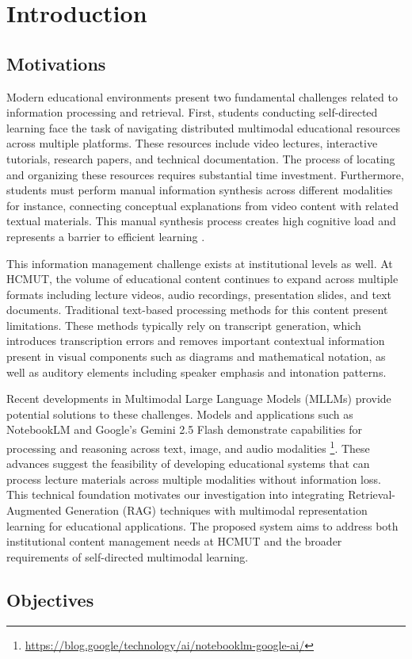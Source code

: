 \chapter{Introduction}

\section{Motivations}

Modern educational environments present two fundamental challenges related to information processing and retrieval. First, students conducting self-directed learning face the task of navigating distributed multimodal educational resources across multiple platforms. These resources include video lectures, interactive tutorials, research papers, and technical documentation. The process of locating and organizing these resources requires substantial time investment. Furthermore, students must perform manual information synthesis across different modalities for instance, connecting conceptual explanations from video content with related textual materials. This manual synthesis process creates high cognitive load and represents a barrier to efficient learning \cite{bib01, bib02}.

This information management challenge exists at institutional levels as well. At HCMUT, the volume of educational content continues to expand across multiple formats including lecture videos, audio recordings, presentation slides, and text documents. Traditional text-based processing methods for this content present limitations. These methods typically rely on transcript generation, which introduces transcription errors and removes important contextual information present in visual components such as diagrams and mathematical notation, as well as auditory elements including speaker emphasis and intonation patterns.

Recent developments in Multimodal Large Language Models (MLLMs) provide potential solutions to these challenges. Models and applications such as NotebookLM and Google's Gemini 2.5 Flash demonstrate capabilities for processing and reasoning across text, image, and audio modalities \footnote{\url{https://blog.google/technology/ai/notebooklm-google-ai/}}. These advances suggest the feasibility of developing educational systems that can process lecture materials across multiple modalities without information loss. This technical foundation motivates our investigation into integrating Retrieval-Augmented Generation (RAG) techniques with multimodal representation learning for educational applications. The proposed system aims to address both institutional content management needs at HCMUT and the broader requirements of self-directed multimodal learning.\section{Objectives}

